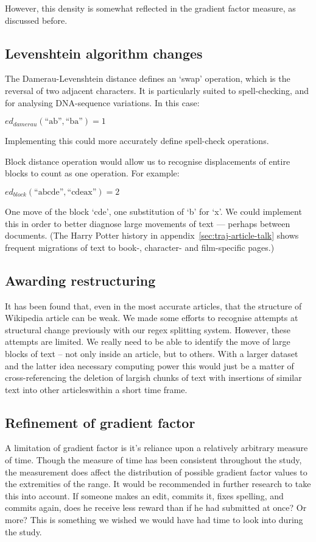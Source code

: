However, this density is somewhat reflected in the gradient factor
measure, as discussed before.

\subsection*{Levenshtein algorithm changes}
The Damerau-Levenshtein distance defines an `swap' operation, which is
the reversal of two adjacent characters. It is particularly suited to
spell-checking, and for analysing DNA-sequence variations. In this
case:

$ed_{damerau}(\text{``ab''},\text{``ba''}) = 1$

Implementing this could more accurately define spell-check operations.

Block distance operation would allow us to recognise displacements of
entire blocks to count as one operation. For
example:

$ed_{block}(\text{``abcde''},\text{``cdeax''})= 2$

One move of the block `cde', one substitution of `b' for
`x'.\cite{Tichy1984} We could implement this in order to better
diagnose large movements of text --- perhaps between documents. (The
Harry Potter history in appendix~\ref{sec:traj-article-talk} shows
frequent migrations of text to book-, character- and film-specific
pages.)

\subsection*{Awarding restructuring}
\label{restructuring}
It has been found that, even in the most accurate articles, that the
structure of Wikipedia article can be weak.\cite{Giles2005} We made
some efforts to recognise attempts at structural change previously
with our regex splitting system. However, these attempts are
limited. We really need to be able to identify the move of large
blocks of text -- not only inside an article, but to others. With a
larger dataset and the latter idea necessary computing power this
would just be a matter of cross-referencing the deletion of largish
chunks of text with insertions of similar text into other
articleswithin a short time frame.

\subsection*{Refinement of gradient factor}
A limitation of gradient factor is it's reliance upon a relatively
arbitrary measure of time. Though the measure of time has been
consistent throughout the study, the measurement does affect the
distribution of possible gradient factor values to the extremities of
the range. It would be recommended in further research to take this
into account. If someone makes an edit, commits it, fixes spelling,
and commits again, does he receive less reward than if he had
submitted at once? Or more? This is something we wished we would have
had time to look into during the study.

